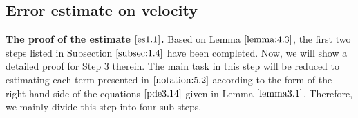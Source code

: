 \documentclass[13pt,CJK]{article}
\theoremstyle{plain}                       %
\theoremstyle{remark}
\numberwithin{equation}{section}
\begin{document}




\subsection{\centering Error estimate on velocity}\label{subsec:5.2}

\noindent
\textbf{The proof of the estimate $\eqref{es1.1}$.}
Based on Lemma $\ref{lemma:4.3}$, the first two steps listed in Subsection $\ref{subsec:1.4}$ have been completed. Now, we will show a detailed proof for Step 3 therein.
The main task in this step will be reduced to estimating
each term presented in $\eqref{notation:5.2}$
according to the form of the right-hand side of the equations
$\eqref{pde3.14}$ given in Lemma $\ref{lemma3.1}$. Therefore, we mainly
divide this step into four sub-steps.
\end{document}
